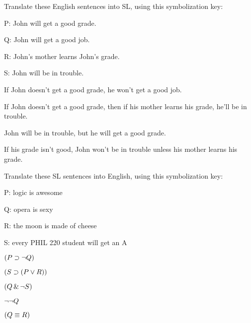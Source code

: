 \problempart
\label{HW2.C}
Translate these English sentences into SL, using this symbolization key:
\begin{ekey}
\item[P:] John will get a good grade.
\item[Q:] John will get a good job.
\item[R:] John's mother learns John's grade.
\item[S:] John will be in trouble.
\end{ekey}
	\begin{earg}
		\item If John doesn’t get a good grade, he won’t get a good job.
		\item If John doesn’t get a good grade, then if his mother learns his grade, he’ll be in
trouble.
		\item John will be in trouble, but he will get a good grade.
		\item If his grade isn't good, John won't be in trouble unless his mother learns his grade.
	\end{earg}

	
\problempart
\label{HW2.D}

Translate these SL sentences into English, using this symbolization key:
\begin{ekey}
\item[P:] logic is awesome
\item[Q:] opera is sexy
\item[R:] the moon is made of cheese
\item[S:] every PHIL 220 student will get an A
\end{ekey}
	\begin{earg}
		\item $(P \supset \neg Q)$
		\item $(S \supset (P \vee R))$
		\item $(Q \,\&\, \neg S)$
		\item $\neg \neg Q$
		\item $(Q \equiv R)$
	\end{earg}
	
